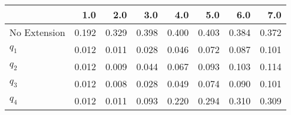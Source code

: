 \begin{tabular}{lrrrrrrr}
\toprule
{} &   1.0 &   2.0 &   3.0 &   4.0 &   5.0 &   6.0 &   7.0 \\
\midrule
No Extension & 0.192 & 0.329 & 0.398 & 0.400 & 0.403 & 0.384 & 0.372 \\
$q_1$        & 0.012 & 0.011 & 0.028 & 0.046 & 0.072 & 0.087 & 0.101 \\
$q_2$        & 0.012 & 0.009 & 0.044 & 0.067 & 0.093 & 0.103 & 0.114 \\
$q_3$        & 0.012 & 0.008 & 0.028 & 0.049 & 0.074 & 0.090 & 0.101 \\
$q_4$        & 0.012 & 0.011 & 0.093 & 0.220 & 0.294 & 0.310 & 0.309 \\
\bottomrule
\end{tabular}
